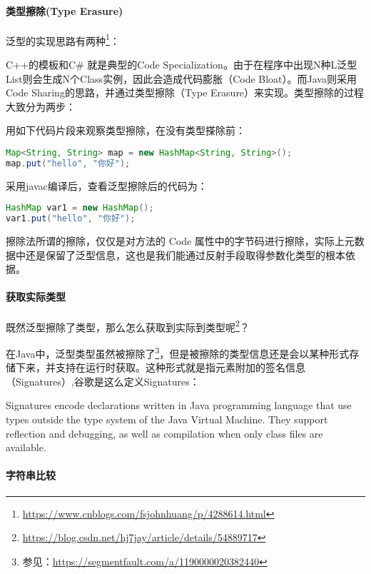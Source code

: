\documentclass[../../../interview-questions.tex]{subfiles}
\begin{document}
\paragraph{类型擦除(Type Erasure)}

泛型的实现思路有两种\footnote{\url{https://www.cnblogs.com/fsjohnhuang/p/4288614.html}}：



C++的模板和C\# 就是典型的Code Specialization。由于在程序中出现N种L泛型List则会生成N个Class实例，因此会造成代码膨胀（Code Bloat）。而Java则采用Code Sharing的思路，并通过类型擦除（Type Erasure）来实现。类型擦除的过程大致分为两步：


用如下代码片段来观察类型擦除，在没有类型搽除前：

\begin{lstlisting}[language=Java]
Map<String, String> map = new HashMap<String, String>();
map.put("hello", "你好");
\end{lstlisting}

采用javac编译后，查看泛型擦除后的代码为：

\begin{lstlisting}[language=Java]
HashMap var1 = new HashMap();
var1.put("hello", "你好");
\end{lstlisting}

擦除法所谓的擦除，仅仅是对方法的 Code 属性中的字节码进行擦除，实际上元数据中还是保留了泛型信息，这也是我们能通过反射手段取得参数化类型的根本依据。

\paragraph{获取实际类型}

既然泛型擦除了类型，那么怎么获取到实际到类型呢\footnote{\url{https://blog.csdn.net/hj7jay/article/details/54889717}}？

在Java中，泛型类型虽然被擦除了\footnote{参见：\url{https://segmentfault.com/a/1190000020382440}}，但是被擦除的类型信息还是会以某种形式存储下来，并支持在运行时获取。这种形式就是指元素附加的签名信息（Signatures）,谷歌是这么定义Signatures：

Signatures encode declarations written in Java programming language that use types outside the type system of the Java Virtual Machine. They support reflection and debugging, as well as compilation when only class files are available.

\paragraph{字符串比较}
\end{document}
